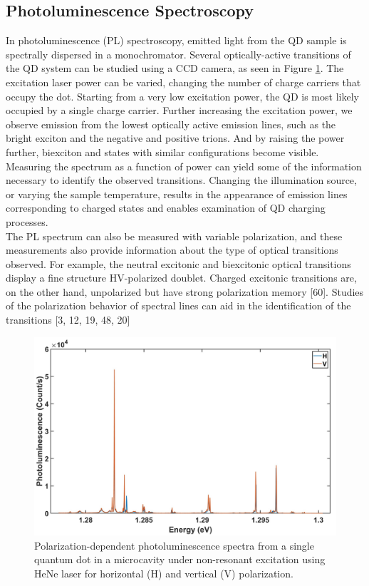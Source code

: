 \subsection{Photoluminescence Spectroscopy}
In photoluminescence (PL) spectroscopy, emitted light from the QD sample is spectrally dispersed in a monochromator. Several optically-active transitions of the QD system can be studied using a CCD camera, as seen in Figure \ref{fig:Spectrum_HV}. The excitation laser power can be varied, changing the number of charge carriers that occupy the dot. Starting from a very low excitation power, the QD is most likely occupied by a single charge carrier. Further increasing the excitation power, we observe emission from the lowest optically active emission lines, such as the bright exciton and the negative and positive trions. And by raising the power further, biexciton and states with similar configurations become visible. Measuring the spectrum as a function of power can yield some of the information necessary to identify the observed transitions. Changing the illumination source, or varying the sample temperature, results in the appearance of emission lines corresponding to charged states and enables examination of QD charging processes.\\
The PL spectrum can also be measured with variable polarization, and these measurements also provide information about the type of optical transitions observed. For example, the neutral excitonic and biexcitonic optical transitions display a fine structure HV-polarized doublet. Charged excitonic transitions are, on the other hand, unpolarized but have strong polarization memory [60]. Studies of the polarization behavior of spectral lines can aid in the identification of the transitions [3, 12, 19, 48, 20]
\begin{figure}[H]
		\centering
		\includegraphics[scale=0.27]{figures/Spectrum.jpg}
		\caption{Polarization-dependent photoluminescence spectra from a single quantum dot in a microcavity under non-resonant excitation using HeNe laser for horizontal (H) and vertical (V) polarization.}
		\label{fig:Spectrum_HV}
	\end{figure}

